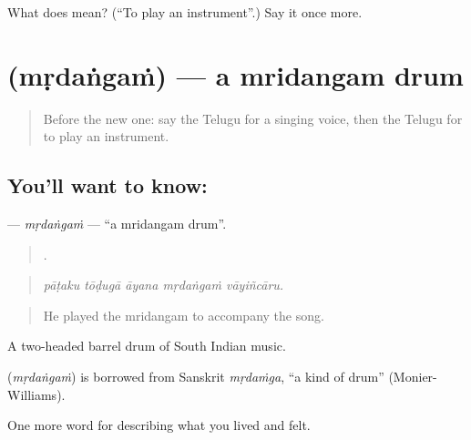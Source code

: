 \begin{tcolorbox}[breakable,colback=teal!4,colframe=teal!35!black,title={Before you move on}]
What does  mean? (\textquotedblleft{}To play an instrument\textquotedblright{}.) Say it once more.
\end{tcolorbox}
\section[\texorpdfstring{\te{మృదంగం} (mṛdaṅgaṁ)}{మృదంగం (mṛdaṅgaṁ)}]{ (mṛdaṅgaṁ) — a mridangam drum}

\label{lesson:TE-C538-mrdangam}



\begin{quote}
Before the new one: say the Telugu for a singing voice, then the Telugu for to play an instrument.
\end{quote}

\subsection*{You'll want to know: }
\textbf{} — \emph{mṛdaṅgaṁ} — \textquotedblleft{}a mridangam drum\textquotedblright{}.

\begin{quote}
    .
\end{quote}

\begin{quote}
\emph{pāṭaku tōḍugā āyana mṛdaṅgaṁ vāyiñcāru.}
\end{quote}

\begin{quote}
He played the mridangam to accompany the song.
\end{quote}

A two-headed barrel drum of South Indian music.

\begin{cousinweb}
\textbf{} (\emph{mṛdaṅgaṁ}) is borrowed from Sanskrit \emph{mṛdaṁga}, \textquotedblleft{}a kind of drum\textquotedblright{} (Monier-Williams).
\end{cousinweb}

\begin{grammarlens}[title={What you've built}]
One more word for describing what you lived and felt.
\end{grammarlens}

